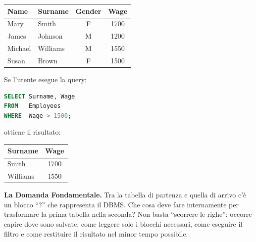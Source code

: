 \documentclass[12pt]{extarticle}
\begin{document}
\begin{center}
\small
\begin{tabular}{llcc}
    \toprule
    \textbf{Name} & \textbf{Surname} & \textbf{Gender} & \textbf{Wage} \\
    \midrule
    Mary   & Smith   & F & 1700 \\
    James  & Johnson & M & 1200 \\
    Michael& Williams& M & 1550 \\
    Susan  & Brown   & F & 1500 \\
    \bottomrule
\end{tabular}
\end{center}

\medskip
\noindent Se l'utente esegue la query:

\begin{lstlisting}[language=SQL]
SELECT Surname, Wage
FROM   Employees
WHERE  Wage > 1500;
\end{lstlisting}

\noindent ottiene il risultato:

\begin{center}
\small
\begin{tabular}{lc}
    \toprule
    \textbf{Surname} & \textbf{Wage} \\
    \midrule
    Smith   & 1700 \\
    Williams& 1550 \\
    \bottomrule
\end{tabular}
\end{center}

\medskip
\noindent \textbf{La Domanda Fondamentale.} Tra la tabella di partenza e quella di arrivo c'è un blocco ``?'' che rappresenta il DBMS. Che cosa deve fare internamente per trasformare la prima tabella nella seconda? Non basta ``scorrere le righe'': occorre capire dove sono salvate, come leggere solo i blocchi necessari, come eseguire il filtro e come restituire il risultato nel minor tempo possibile.
\end{document}

